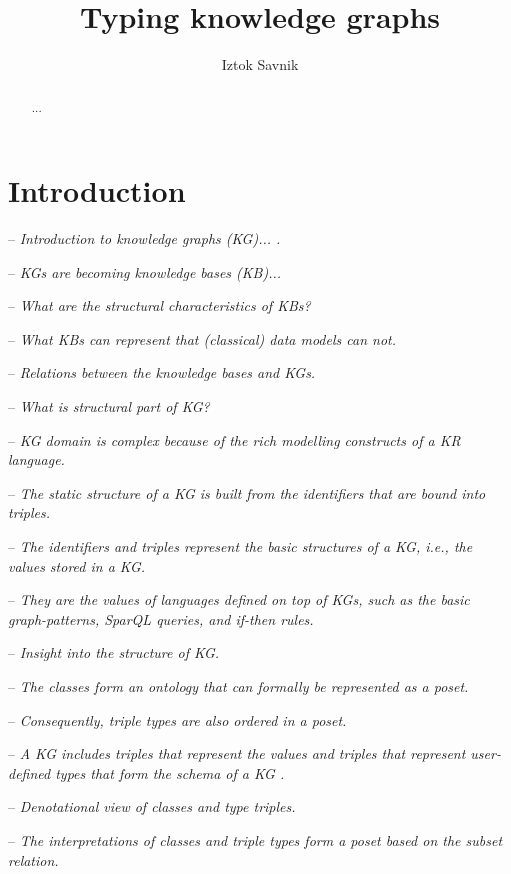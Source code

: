 \documentclass[runningheads]{llncs}
\newcommand{\notes}[1]{\noindent\begin{small}-- \emph{#1}\hfill\break\end{small}}
\begin{document}
\title{Typing knowledge graphs}

\author{Iztok Savnik} 



\maketitle

\begin{abstract}
...
\end{abstract}


\thispagestyle{headings}




\section{Introduction}

\notes{Introduction to knowledge graphs (KG)... \cite{Hogan2022,Ehrlinger2016}.}
\notes{KGs are becoming knowledge bases (KB)...}
\notes{What are the structural characteristics of KBs?}
\notes{What KBs can represent that (classical) data models can not.}
\notes{Relations between the knowledge bases and KGs.}

\notes{What is structural part of KG?}
\notes{KG domain is complex because of the rich modelling constructs of a KR language.}
\notes{The static structure of a KG is built from the identifiers that are bound into triples.}
\notes{The identifiers and triples represent the basic structures of a KG, i.e., the values stored in a KG.}
\notes{They are the values of languages defined on top of KGs, such as the basic graph-patterns, SparQL queries, and if-then rules.}
\notes{Insight into the structure of KG.}
\notes{The classes form an ontology that can formally be represented as a poset.}
\notes{Consequently, triple types are also ordered in a poset.}
\notes{A KG includes triples that represent the values and triples that represent user-defined types that form the schema of a KG \cite{Savnik2025}.}
\notes{Denotational view of classes and type triples.}
\notes{The interpretations of classes and triple types form a poset based on the subset relation.}
\end{document}
